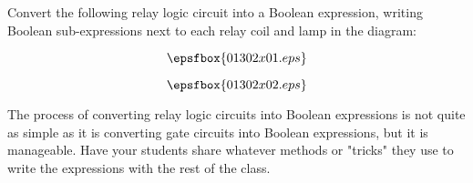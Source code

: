 

Convert the following relay logic circuit into a Boolean expression, writing Boolean sub-expressions next to each relay coil and lamp in the diagram:

\vskip 10pt

$$\epsfbox{01302x01.eps}$$







$$\epsfbox{01302x02.eps}$$







The process of converting relay logic circuits into Boolean expressions is not quite as simple as it is converting gate circuits into Boolean expressions, but it is manageable.  Have your students share whatever methods or "tricks" they use to write the expressions with the rest of the class.




